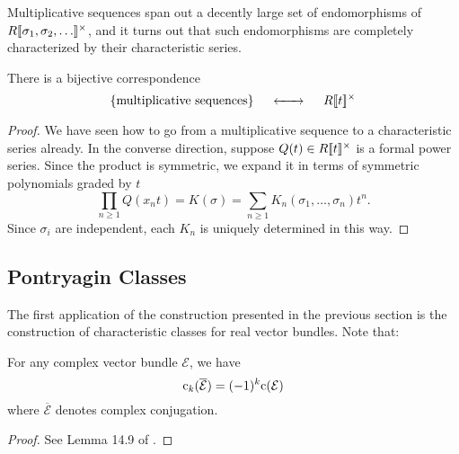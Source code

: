Multiplicative sequences span out a decently large set of endomorphisms of $R[\![\sigma_1,\sigma_2,\ldots]\!]^\times$, and it turns out that such endomorphisms are completely characterized by their characteristic series.

\begin{theorem}
	There is a bijective correspondence
	\[
		\left\{\parbox{10.5em}{multiplicative sequences}\right\} \quad\lkxleftrightto\quad R\fps{t}^\times
	\]
\end{theorem}
\begin{proof}
	We have seen how to go from a multiplicative sequence to a characteristic series already. In the converse direction, suppose $Q(t)\in R[\![t]\!]^\times$ is a formal power series. Since the product is symmetric, we expand it in terms of symmetric polynomials graded by $t$
	\[
		 \prod_{n\geq 1} Q(x_n t) = K(\sigma)= \sum_{n\geq 1}K_n(\sigma_1,\ldots, \sigma_n) t^n.
	\]
	Since $\sigma_i$ are independent, each $K_n$ is uniquely determined in this way.
\end{proof}

\subsection{Pontryagin Classes}

The first application of the construction presented in the previous section is the construction of characteristic classes for real vector bundles. Note that:
\begin{proposition}\label{prop:chern-conjugation}
	For any complex vector bundle $\mathcal{E}$, we have
	\[
		\mathrm{c}_k(\overline{\mathcal{E}}) = (-1)^k\mathrm{c}(\mathcal{E})
	\]
	where $\overline{\mathcal{E}}$ denotes complex conjugation.
\end{proposition}
\begin{proof}
	See Lemma 14.9 of \cite{milnorstasheff1974}.
\end{proof}

